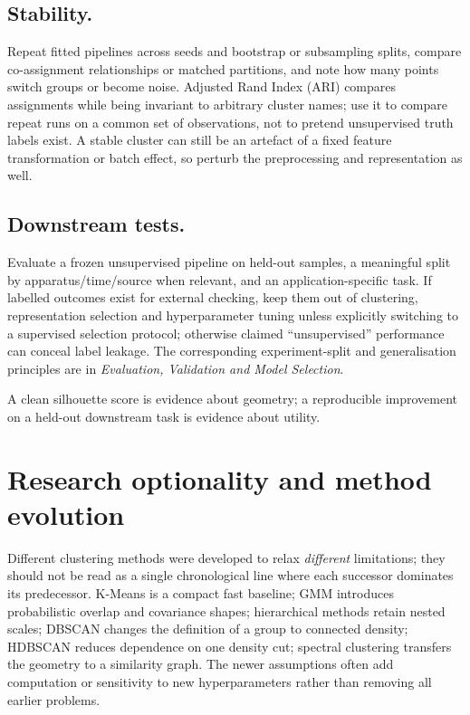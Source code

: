 \subsection{Stability.}
Repeat fitted pipelines across seeds and bootstrap or subsampling splits, compare co-assignment relationships or matched partitions, and note how many points switch groups or become noise.
Adjusted Rand Index (ARI) compares assignments while being invariant to arbitrary cluster names; use it to compare repeat runs on a common set of observations, not to pretend unsupervised truth labels exist.
A stable cluster can still be an artefact of a fixed feature transformation or batch effect, so perturb the preprocessing and representation as well.
\subsection{Downstream tests.}
Evaluate a frozen unsupervised pipeline on held-out samples, a meaningful split by apparatus/time/source when relevant, and an application-specific task.
If labelled outcomes exist for external checking, keep them out of clustering, representation selection and hyperparameter tuning unless explicitly switching to a supervised selection protocol; otherwise claimed ``unsupervised'' performance can conceal label leakage.
The corresponding experiment-split and generalisation principles are in \emph{Evaluation, Validation and Model Selection}.

\begin{calloutpractical}
A clean silhouette score is evidence about geometry; a reproducible improvement on a held-out downstream task is evidence about utility.
\end{calloutpractical}

\section{Research optionality and method evolution}\label{sec:optionality}
Different clustering methods were developed to relax \emph{different} limitations; they should not be read as a single chronological line where each successor dominates its predecessor.
K-Means is a compact fast baseline; GMM introduces probabilistic overlap and covariance shapes; hierarchical methods retain nested scales; DBSCAN changes the definition of a group to connected density; HDBSCAN reduces dependence on one density cut; spectral clustering transfers the geometry to a similarity graph.
The newer assumptions often add computation or sensitivity to new hyperparameters rather than removing all earlier problems.

